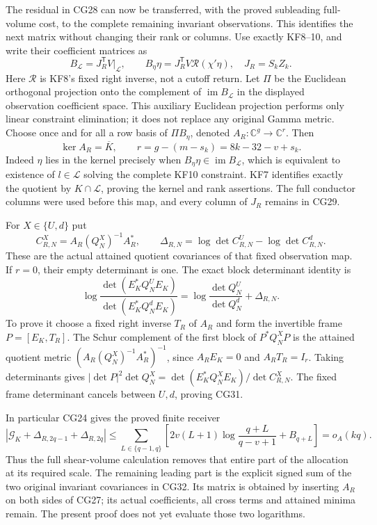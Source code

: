 The residual in CG28 can now be transferred, with the proved subleading full-volume cost, to the complete remaining invariant observations. This identifies the next matrix without changing their rank or columns. Use exactly KF8--10, and write their coefficient matrices as \[
B_{\mathcal L}=J_R^{\mathsf T}V\big|_{\mathcal L},\qquad
B_\eta\eta=J_R^{\mathsf T}V\mathcal R(\chi'\eta),
\quad J_R=S_kZ_k.
\tag{CG29}
\] Here \(\mathcal R\) is KF8's fixed right inverse, not a cutoff return. Let \(\Pi\) be the Euclidean orthogonal projection onto the complement of \(\operatorname{im}B_{\mathcal L}\) in the displayed observation coefficient space. This auxiliary Euclidean projection performs only linear constraint elimination; it does not replace any original Gamma metric. Choose once and for all a row basis of \(\Pi B_\eta\), denoted \(A_R:\mathbb C^g\to\mathbb C^r\). Then \[
\ker A_R=\overline K,\qquad
r=g-(m-s_k)=8k-32-v+s_k.
\tag{CG30}
\] Indeed \(\eta\) lies in the kernel precisely when \(B_\eta\eta\in\operatorname{im}B_{\mathcal L}\), which is equivalent to existence of \(l\in\mathcal L\) solving the complete KF10 constraint. KF7 identifies exactly the quotient by \(K\cap\mathcal L\), proving the kernel and rank assertions. The full conductor columns were used before this map, and every column of \(J_R\) remains in CG29.

For \(X\in\{U,d\}\) put \[
C_{R,N}^X=A_R(Q_N^X)^{-1}A_R^*,\qquad
\Delta_{R,N}=\log\det C_{R,N}^U-\log\det C_{R,N}^d.
\] These are the actual attained quotient covariances of that fixed observation map. If \(r=0\), their empty determinant is one. The exact block determinant identity is \[
\boxed{\log\frac{\det(E_K^*Q_N^UE_K)}{\det(E_K^*Q_N^dE_K)}
=\log\frac{\det Q_N^U}{\det Q_N^d}+\Delta_{R,N}.}
\tag{CG31}
\] To prove it choose a fixed right inverse \(T_R\) of \(A_R\) and form the invertible frame \(P=[E_K,T_R]\). The Schur complement of the first block of \(P^*Q_N^XP\) is the attained quotient metric \((A_R(Q_N^X)^{-1}A_R^*)^{-1}\), since \(A_RE_K=0\) and \(A_RT_R=I_r\). Taking determinants gives \(|\det P|^2\det Q_N^X
=\det(E_K^*Q_N^XE_K)/\det C_{R,N}^X\). The fixed frame determinant cancels between \(U,d\), proving CG31.

In particular CG24 gives the proved finite receiver \[
\left|\mathcal G_K+
\Delta_{R,2q-1}+\Delta_{R,2q}\right|
\le\sum_{L\in\{q-1,q\}}
\left[2v(L+1)\log\frac{q+L}{q-v+1}+B_{q+L}\right]
=o_A(kq).
\tag{CG32}
\] Thus the full shear-volume calculation removes that entire part of the allocation at its required scale. The remaining leading part is the explicit signed sum of the two original invariant covariances in CG32. Its matrix is obtained by inserting \(A_R\) on both sides of CG27; its actual coefficients, all cross terms and attained minima remain. The present proof does not yet evaluate those two logarithms.

